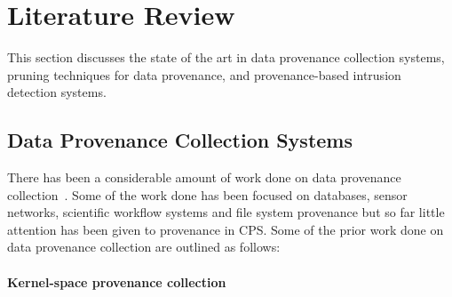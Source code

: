 


\chapter{Literature Review}\label{background}

This section discusses the state of the art in data provenance collection systems, pruning techniques for data provenance, and provenance-based intrusion detection systems.


\section{Data Provenance Collection Systems}

There has been a considerable amount of work done on data provenance collection~\cite{ bates_trustworthy_2015, gessiou_towards_2012, _general-purpose_2012, muniswamy_reddy_provenance_2010}. Some of the work done has been focused on databases, sensor networks, scientific workflow systems and file system provenance but so far little attention has been given to provenance in CPS. Some of the prior work done on data provenance collection are outlined as follows:




\subsubsection{Kernel-space provenance collection}

